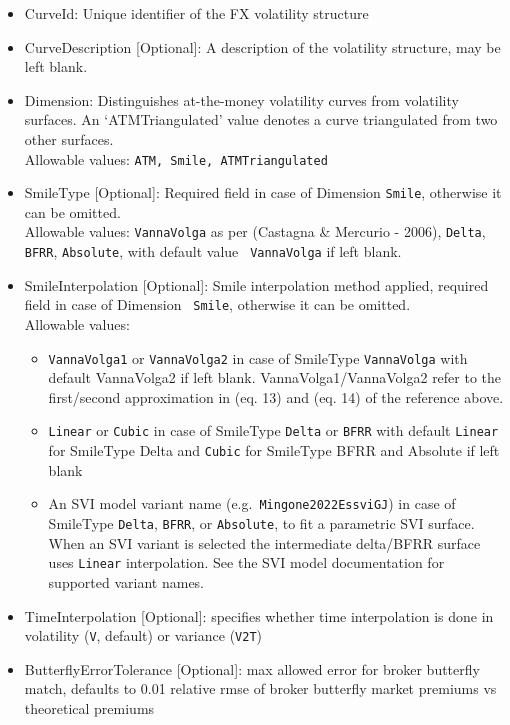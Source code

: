 \begin{itemize}
\item CurveId: Unique identifier of the FX volatility structure
\item CurveDescription [Optional]: A description of the volatility structure, may be left blank.
\item Dimension: Distinguishes at-the-money volatility curves from volatility surfaces. An `ATMTriangulated' value
  denotes a curve triangulated from two other surfaces.\\ Allowable values: {\tt ATM, Smile, ATMTriangulated}
\item SmileType [Optional]: Required field in case of Dimension {\tt Smile}, otherwise it can be omitted. \\ Allowable
  values: {\tt VannaVolga} as per (Castagna \& Mercurio - 2006), {\tt Delta}, {\tt BFRR}, {\tt Absolute}, with default value {\tt
    VannaVolga} if left blank.
\item SmileInterpolation [Optional]: Smile interpolation method applied, required field in case of Dimension {\tt
  Smile}, otherwise it can be omitted. \\ Allowable values:
\begin{itemize}
\item {\tt VannaVolga1} or {\tt VannaVolga2} in case of SmileType {\tt VannaVolga} with default VannaVolga2 if left
  blank.  VannaVolga1/VannaVolga2 refer to the first/second approximation in (eq. 13) and (eq. 14) of the reference
  above.
\item {\tt Linear} or {\tt Cubic} in case of SmileType {\tt Delta} or {\tt BFRR} with default {\tt Linear} for SmileType
  Delta and {\tt Cubic} for SmileType BFRR and Absolute if left blank
\item An SVI model variant name (e.g.\ {\tt Mingone2022EssviGJ}) in case of SmileType {\tt Delta}, {\tt BFRR}, or
  {\tt Absolute}, to fit a parametric SVI surface. When an SVI variant is selected the intermediate delta/BFRR surface
  uses {\tt Linear} interpolation. See the SVI model documentation for supported variant names.
\end{itemize}
\item TimeInterpolation [Optional]: specifies whether time interpolation is done in volatility ({\tt V}, default) or
  variance ({\tt V2T})
\item ButterflyErrorTolerance [Optional]: max allowed error for broker butterfly match, defaults to 0.01 relative rmse
  of broker butterfly market premiums vs theoretical premiums

\end{itemize}
